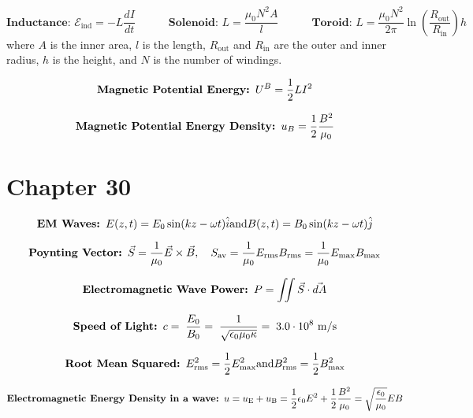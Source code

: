 \documentclass[fleqn,12pt]{article}
\begin{document}
\begin{equation} \label{eq1}
 \textbf{Inductance: }\mathcal{E}_\mathrm{ind} = -L \frac{dI}{dt}
 \quad \quad \quad \textbf{Solenoid: }L = \frac{\mu_0 N^2 A}{l}
 \quad \quad \quad \textbf{Toroid: }L = \frac{\mu_0 N^2}{2\pi}\ln \left( \frac{R_\mathrm{out}}{R_\mathrm{in}} \right)h
\end{equation}
where $A$ is the inner area, $l$ is the length, $R_\mathrm{out}$ and $R_\mathrm{in}$ are the outer and inner radius, $h$ is the height, and $N$ is the number of windings.

\begin{equation}
    \label{eq2}
   \mbox{\textbf{Magnetic Potential Energy: }} U^B = \frac{1}{2}LI^2
\end{equation}

\begin{equation}
    \label{eq3}
    \mbox{\textbf{Magnetic Potential Energy Density: }}u_B = \frac{1}{2}\frac{B^2}{\mu_0}
\end{equation}

\section*{Chapter 30}

\begin{equation}
    \label{eq3}
    \mbox{\textbf{EM Waves: }}
    {E}(z,t) = {E_0}\sin(kz - \omega t)\hat{i} \\ \mbox{and} \\ {B}(z,t) = {B_0}\sin(kz - \omega t)\hat{j}
\end{equation}


\begin{equation}
    \label{eq3}
    \mbox{\textbf{Poynting Vector: }}
    \vec{S} = \frac{1}{\mu_0}\vec{E} \times \vec{B},\quad S_\mathrm{av} = \frac{1}{\mu_0}E_\mathrm{rms}B_\mathrm{rms} = \frac{1}{\mu_0}E_\mathrm{max}B_\mathrm{max}
\end{equation}

\begin{equation}
    \label{eq3}
    \mbox{\textbf{Electromagnetic Wave Power: }}
    P = \iint \vec{S} \cdot \vec{dA}
\end{equation}

\begin{equation}
    \label{eq3}
    \mbox{\textbf{Speed of Light: }}
    c = \; \frac{E_0}{B_0} = \; \frac{1}{\sqrt{\epsilon_0\mu_0\kappa}}  = \; 3.0 \cdot 10^8 \  \si{\meter\per\second}
\end{equation}

\begin{equation}
    \label{eq3}
    \mbox{\textbf{Root Mean Squared: }}
    E_\mathrm{rms}^{2} = \frac{1}{2}E_\mathrm{max}^2 \\ \mbox{and} \\ B_\mathrm{rms}^{2} = \frac{1}{2}B_\mathrm{max}^2
\end{equation}

\begin{equation}
    \label{eq3}
    \mbox{\textbf{Electromagnetic Energy Density in a wave: }}
    u = u_\mathrm{E} + u_\mathrm{B} = \frac{1}{2}\epsilon_0E^2 + \frac{1}{2}\frac{B^2}{\mu_0} = \sqrt{\frac{\epsilon_0}{\mu_0}}E B
\end{equation}
\end{document}
